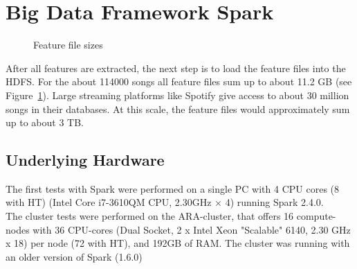 \section{Big Data Framework Spark}\label{bds1}

\begin{figure}[htbp]
	\centering
	\caption{Feature file sizes}
	\label{filesize}
\end{figure}

\noindent After all features are extracted, the next step is to load the feature files into the HDFS.
For the about 114000 songs all feature files sum up to about 11.2 GB (see Figure~\ref{filesize}). 
\noindent Large streaming platforms like Spotify give access to about 30 million songs in their databases. At this scale, the feature files would approximately sum up to about 3 TB.\\

\subsection{Underlying Hardware}

The first tests with Spark were performed on a single PC with 4 CPU cores (8 with HT) (Intel Core i7-3610QM CPU, 2.30GHz × 4) running Spark 2.4.0.\\ The cluster tests were performed on the ARA-cluster, that offers 16 compute-nodes with 36 CPU-cores (Dual Socket, 2 x Intel Xeon "Scalable" 6140, 2.30 GHz x 18) per node (72 with HT), and 192GB of RAM. The cluster was running with an older version of Spark (1.6.0)\\

